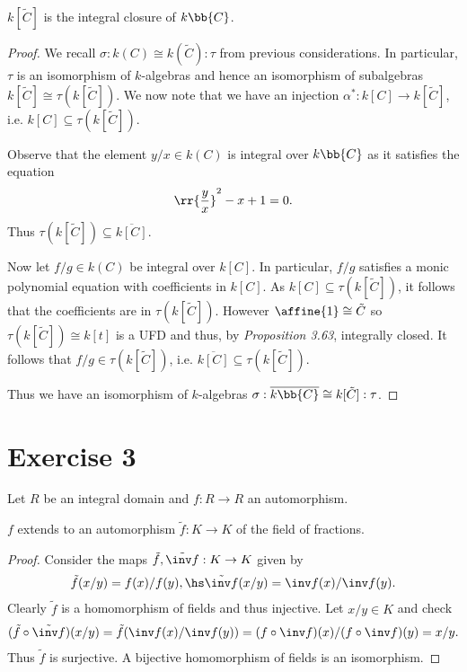 \documentclass{article}
\begin{document}
\begin{claim*}[3c]
  $k[\tilde C]$ is the integral closure of $k\bb{C}$.
  \begin{proof}
    We recall $\sigma: k(C)\cong k(\tilde C):\tau$ from previous considerations.
    In particular, $\tau$ is an isomorphism of $k$-algebras and hence an isomorphism of
    subalgebras $k[\tilde C]\cong \tau(k[\tilde C])$.
    We now note that we have an injection $\alpha^*:k[C]\to k[\tilde C]$, i.e.
    $k[C]\subseteq\tau(k[\tilde C])$.

    Observe that the element $y/x\in k(C)$ is integral over $k\bb{C}$ as
    it satisfies the equation
    \begin{align*}
      \rr{\frac{y}{x}}^2 - x + 1 = 0.
    \end{align*}
    Thus $\tau(k[\tilde C])\subseteq \overline{k[C]}$.

    Now let $f/g\in k(C)$ be integral over ${k[C]}$. In particular, $f/g$ satisfies
    a monic polynomial equation with coefficients in $k[C]$.
    As $k[C]\subseteq\tau(k[\tilde C])$, it follows that the coefficients are in
    $\tau(k[\tilde C])$. However $\affine{1}\cong\tilde C$ so $\tau(k[\tilde C])\cong k[t]$
    is a UFD and thus, by \emph{Proposition 3.63}, integrally closed. It follows that
    $f/g\in\tau(k[\tilde C])$, i.e. $\overline{k[C]}\subseteq \tau(k[\tilde C])$.

    Thus we have an isomorphism of $k$-algebras
    $\sigma : \overline{k\bb{C}} \cong k[\tilde C] : \tau$.
  \end{proof}
\end{claim*}

\section*{Exercise 3}

Let $R$ be an integral domain and $f:R\to R$ an automorphism.

\begin{claim*}[1a]
  $f$ extends to an automorphism $\tilde f:K\to K$ of the field of fractions.
  \begin{proof}
    Consider the maps $\tilde f,\tilde{\inv f}: K\to K$ given by
    \begin{align*}
      \tilde f(x/y) = f(x)/f(y), \hs \tilde{\inv f}(x/y)=\inv f(x)/\inv f(y).
    \end{align*}
    Clearly $\tilde f$ is a homomorphism of fields and thus injective. Let $x/y\in K$
    and check
    \begin{align*}
      (\tilde f\circ\tilde{\inv f})(x/y) = \tilde f(\inv f(x)/\inv f(y)) = (f\circ\inv f)(x)/(f\circ\inv f)(y) = x/y.
    \end{align*}
    Thus $\tilde f$ is surjective. A bijective homomorphism of fields is an isomorphism.
  \end{proof}
\end{claim*}
\end{document}
